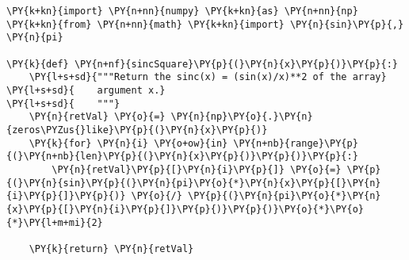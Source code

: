 \begin{Verbatim}[commandchars=\\\{\}]
\PY{k+kn}{import} \PY{n+nn}{numpy} \PY{k+kn}{as} \PY{n+nn}{np}
\PY{k+kn}{from} \PY{n+nn}{math} \PY{k+kn}{import} \PY{n}{sin}\PY{p}{,} \PY{n}{pi}

\PY{k}{def} \PY{n+nf}{sincSquare}\PY{p}{(}\PY{n}{x}\PY{p}{)}\PY{p}{:}
    \PY{l+s+sd}{"""Return the sinc(x) = (sin(x)/x)**2 of the array}
\PY{l+s+sd}{    argument x.}
\PY{l+s+sd}{    """}
    \PY{n}{retVal} \PY{o}{=} \PY{n}{np}\PY{o}{.}\PY{n}{zeros\PYZus{}like}\PY{p}{(}\PY{n}{x}\PY{p}{)}
    \PY{k}{for} \PY{n}{i} \PY{o+ow}{in} \PY{n+nb}{range}\PY{p}{(}\PY{n+nb}{len}\PY{p}{(}\PY{n}{x}\PY{p}{)}\PY{p}{)}\PY{p}{:}
        \PY{n}{retVal}\PY{p}{[}\PY{n}{i}\PY{p}{]} \PY{o}{=} \PY{p}{(}\PY{n}{sin}\PY{p}{(}\PY{n}{pi}\PY{o}{*}\PY{n}{x}\PY{p}{[}\PY{n}{i}\PY{p}{]}\PY{p}{)} \PY{o}{/} \PY{p}{(}\PY{n}{pi}\PY{o}{*}\PY{n}{x}\PY{p}{[}\PY{n}{i}\PY{p}{]}\PY{p}{)}\PY{p}{)}\PY{o}{*}\PY{o}{*}\PY{l+m+mi}{2}

    \PY{k}{return} \PY{n}{retVal}
\end{Verbatim}
